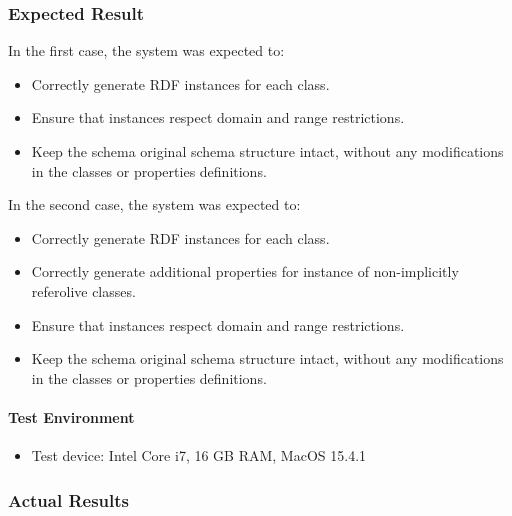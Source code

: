 \subsubsection{Expected Result}

In the first case, the system was expected to:
\begin{itemize}
    \item Correctly generate RDF instances for each class.
    \item Ensure that instances respect domain and range restrictions.
    \item Keep the schema original schema structure intact, without any modifications in the classes or properties definitions.
\end{itemize}

In the second case, the system was expected to:
\begin{itemize}
    \item Correctly generate RDF instances for each class.
    \item Correctly generate additional properties for instance of non-implicitly referolive classes. 
    \item Ensure that instances respect domain and range restrictions.
    \item Keep the schema original schema structure intact, without any modifications in the classes or properties definitions.
\end{itemize}


\paragraph{Test Environment}
\begin{itemize}
    \item Test device: Intel Core i7, 16 GB RAM, MacOS 15.4.1 
\end{itemize}

\subsubsection{Actual Results}

